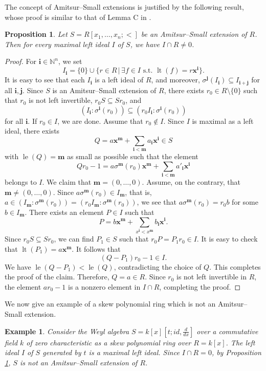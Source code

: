 \documentclass[11pt,a4paper]{article}
\theoremstyle{theorem}
\newtheorem{proposition}[theorem]{Proposition}
\newtheorem{example}{Example}[section]
\numberwithin{equation}{section}
\newcommand{\s}{\sigma}
\begin{document}
		The concept of Amitsur--Small extensions is justified by the following result, whose proof is  similar to that of Lemma C in  \cite{AmitsurSmall}.
		\begin{proposition}\label{prop: ASextensions}
			Let $S=R[x_1,\dots,x_n;<]$ be an Amitsur--Small extension of $R$. Then for every maximal left ideal $I$ of $S$, we have $I\cap R\neq 0$.
		\end{proposition}
		\begin{proof}
			For  $\mathbf{i}\in \mathbb{N}^n$, we set 
			 $$I_{\mathbf{i}}=\{0\}\cup \{r\in R \,|\, \exists f\in I \text{ s.t. } \operatorname{lt}(f)=r{\mathbf{x}}^{\mathbf{i}}\}.$$ It is easy to see that each $I_{\mathbf{i}}$ is  a left ideal of $R$, and moreover, 
			$\s^{\mathbf{j}}(I_{\mathbf{i}})\subseteq I_{\mathbf{i}+\mathbf{j}}$ for all $\mathbf{i},\mathbf{j}$. Since $S$ is an Amitsur--Small extension of $R$, there exists $r_0\in R\setminus\{0\}$ such that  \(r_0\) is not left invertible, $r_0S\subseteq Sr_0$, and 
			\[
				(I_{\mathbf{i}}:\s^{\mathbf{i}}(r_0))\subseteq (r_0I_{\mathbf{i}}:\s^{\mathbf{i}}(r_0))
			\] for all $\mathbf{i}$. If $r_0\in I$, we are done. Assume that $r_0\notin I$. Since $I$ is maximal as a left ideal, there exists $$Q=a{\mathbf{x}}^{\mathbf{m}}+\sum_{\mathbf{i}<\mathbf{m}}a_{\mathbf{i}}{\mathbf{x}}^{\mathbf{i}}\in S$$ with $\operatorname{le}(Q)=\mathbf{m}$ as small as possible such that the element
			$$Qr_0-1=a\s^{\mathbf{m}}(r_0){\mathbf{x}}^{\mathbf{m}}+\sum_{\mathbf{i}<\mathbf{m}}a'_{\mathbf{i}}{\mathbf{x}}^{\mathbf{i}}$$ belongs to $I$.   We claim that $\mathbf{m}=(0,\dots,0)$. Assume, on the contrary, that $\mathbf{m}\neq (0,\dots,0)$. Since $a\s^{\mathbf{m}}(r_0)\in I_\mathbf{m}$, that is, \(a\in (I_\mathbf{m}:\s^{\mathbf{m}}(r_0)) = (r_0I_{\mathbf{m}}:\s^{\mathbf{m}}(r_0))\), we see that  $a\s^{\mathbf{m}}(r_0)=r_0b$ for some $b\in I_\mathbf{m}$. There exists an element $P\in I$ such that 
			$$P=b{\mathbf{x}}^{\mathbf{m}}+\sum_{x^\mathbf{i}<x^\mathbf{m}}b_{\mathbf{i}}{\mathbf{x}}^{\mathbf{i}}.$$
			Since $r_0S\subseteq Sr_0$, we can find $P_1\in S$ such that   $r_0P=P_1r_0\in I$. It is easy to check that $\operatorname{lt}(P_1)=a{\mathbf{x}}^{\mathbf{m}}$. 
			It follows that $$(Q-P_1)r_0-1\in I.$$  We have $\operatorname{le}(Q-P_1)<\operatorname{le}(Q)$, contradicting the choice of $Q$. This completes the proof of the claim. Therefore, \(Q =a \in R\). Since $r_0$ is not left invertible in $R$, the element $ar_0-1$ is a nonzero element in $I\cap R$, completing the proof.   
		\end{proof}
	We now give an example of a skew polynomial ring which is not an Amitsur--Small extension. 
		\begin{example}\label{exam: notAS}
		Consider the  Weyl algebra $S = k[x][t;id,\frac{d}{d x}]$ over a commutative field $k$ of zero characteristic as a skew polynomial ring over \(R = k[x]\). The left ideal \(I\) of \(S\) generated by \(t\) is a maximal left ideal. Since \(I\cap R=0\), by  Proposition \ref{prop: ASextensions}, \(S\) is not an Amitsur--Small extension of \(R\). 
	\end{example}
\end{document}
